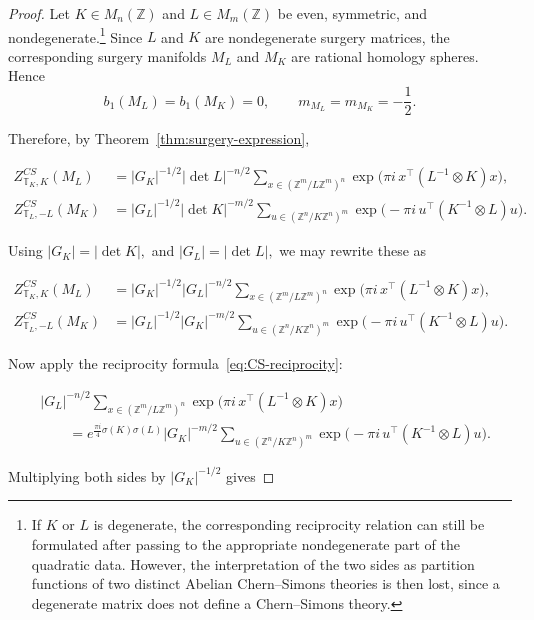 \documentclass[12pt]{amsart}
\numberwithin{equation}{section}
\theoremstyle{definition}
\begin{document}
\begin{proof}
Let $K\in M_n(\mathbb Z)$ and $L\in M_m(\mathbb Z)$ be even, symmetric, and nondegenerate.\footnote{If $K$ or $L$ is degenerate, the corresponding reciprocity relation can still be formulated after passing to the appropriate nondegenerate part of the quadratic data. However, the interpretation of the two sides as partition functions of two distinct Abelian Chern--Simons theories is then lost, since a degenerate matrix does not define a Chern--Simons theory.}
Since $L$ and $K$ are nondegenerate surgery matrices, the corresponding surgery manifolds $M_L$ and $M_K$ are rational homology spheres. Hence
$$
b_1(M_L)=b_1(M_K)=0,
\qquad
m_{M_L}=m_{M_K}=-\frac12.
$$

Therefore, by Theorem~\ref{thm:surgery-expression},

$$
\begin{aligned}
Z^{CS}_{\mathbb T_K,K}(M_L)
&=
|G_K|^{-1/2}|\det L|^{-n/2}
\sum_{x\in (\mathbb Z^m/L\mathbb Z^m)^n}
\exp\!\bigl(
\pi i\,x^\top(L^{-1}\otimes K)x
\bigr),
\\
Z^{CS}_{\mathbb T_L,-L}(M_K)
&=
|G_L|^{-1/2}|\det K|^{-m/2}
\sum_{u\in (\mathbb Z^n/K\mathbb Z^n)^m}
\exp\!\bigl(
-\pi i\,u^\top(K^{-1}\otimes L)u
\bigr).
\end{aligned}
$$

Using $|G_K|=|\det K|,$ and $|G_L|=|\det L|,$ we may rewrite these as

$$
\begin{aligned}
Z^{CS}_{\mathbb T_K,K}(M_L)
&=
|G_K|^{-1/2}|G_L|^{-n/2}
\sum_{x\in (\mathbb Z^m/L\mathbb Z^m)^n}
\exp\!\bigl(
\pi i\,x^\top(L^{-1}\otimes K)x
\bigr),
\\
Z^{CS}_{\mathbb T_L,-L}(M_K)
&=
|G_L|^{-1/2}|G_K|^{-m/2}
\sum_{u\in (\mathbb Z^n/K\mathbb Z^n)^m}
\exp\!\bigl(
-\pi i\,u^\top(K^{-1}\otimes L)u
\bigr).
\end{aligned}
$$

Now apply the reciprocity formula~\eqref{eq:CS-reciprocity}:

$$
\begin{aligned}
&|G_L|^{-n/2}
\sum_{x\in (\mathbb Z^m/L\mathbb Z^m)^n}
\exp\!\bigl(
\pi i\,x^\top(L^{-1}\otimes K)x
\bigr)
\\
&\qquad =
e^{\frac{\pi i}{4}\sigma(K)\sigma(L)}
|G_K|^{-m/2}
\sum_{u\in (\mathbb Z^n/K\mathbb Z^n)^m}
\exp\!\bigl(
-\pi i\,u^\top(K^{-1}\otimes L)u
\bigr).
\end{aligned}
$$

Multiplying both sides by $|G_K|^{-1/2}$ gives


\end{proof}
\end{document}
